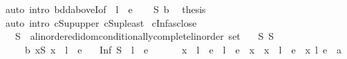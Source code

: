 \begin{isabellebody}
\ {\isacharparenleft}{\kern0pt}auto\ intro{\isacharbang}{\kern0pt}{\isacharcolon}{\kern0pt}\ bdd{\isacharunderscore}{\kern0pt}aboveI{\isacharbrackleft}{\kern0pt}of\ {\isacharunderscore}{\kern0pt}\ {\isachardoublequoteopen}l\ {\isacharplus}{\kern0pt}\ e{\isachardoublequoteclose}{\isacharbrackright}{\kern0pt}{\isacharparenright}{\kern0pt}\isanewline
\ \ \isamarkupfalse%
\ S\ b\ \isamarkupfalse%
\ {\isacharquery}{\kern0pt}thesis\isanewline
\ \ \ \ \isamarkupfalse%
\ {\isacharasterisk}{\kern0pt}\ \isamarkupfalse%
\ {\isacharparenleft}{\kern0pt}auto\ intro{\isacharbang}{\kern0pt}{\isacharcolon}{\kern0pt}\ cSup{\isacharunderscore}{\kern0pt}upper{}\ cSup{\isacharunderscore}{\kern0pt}least{\isacharparenright}{\kern0pt}\isanewline
{}\isamarkupfalse%
%
\endisatagproof
{\isafoldproof}%
%
\isadelimproof
\isanewline
%
\endisadelimproof
\isanewline
{}\isamarkupfalse%
\ cInf{\isacharunderscore}{\kern0pt}asclose{\isacharcolon}{\kern0pt}\isanewline
\ \ \ S\ {\isacharcolon}{\kern0pt}{\isacharcolon}{\kern0pt}\ {\isachardoublequoteopen}{\isacharprime}{\kern0pt}a{\isacharcolon}{\kern0pt}{\isacharcolon}{\kern0pt}{\isacharbraceleft}{\kern0pt}linordered{\isacharunderscore}{\kern0pt}idom{\isacharcomma}{\kern0pt}conditionally{\isacharunderscore}{\kern0pt}complete{\isacharunderscore}{\kern0pt}linorder{\isacharbraceright}{\kern0pt}\ set{\isachardoublequoteclose}\isanewline
\ \ \ S{\isacharcolon}{\kern0pt}\ {\isachardoublequoteopen}S\ {\isasymnoteq}\ {\isacharbraceleft}{\kern0pt}{\isacharbraceright}{\kern0pt}{\isachardoublequoteclose}\isanewline
\ \ \ \ \ b{\isacharcolon}{\kern0pt}\ {\isachardoublequoteopen}{\isasymforall}x{\isasymin}S{\isachardot}{\kern0pt}\ {\isasymbar}x\ {\isacharminus}{\kern0pt}\ l{\isasymbar}\ {\isasymle}\ e{\isachardoublequoteclose}\isanewline
\ \ \ {\isachardoublequoteopen}{\isasymbar}Inf\ S\ {\isacharminus}{\kern0pt}\ l{\isasymbar}\ {\isasymle}\ e{\isachardoublequoteclose}\isanewline
%
\isadelimproof
%
\endisadelimproof
%
\isatagproof
{}\isamarkupfalse%
\ {\isacharminus}{\kern0pt}\isanewline
\ \ \isamarkupfalse%
\ {\isacharasterisk}{\kern0pt}{\isacharcolon}{\kern0pt}\ {\isachardoublequoteopen}{\isasymbar}x\ {\isacharminus}{\kern0pt}\ l{\isasymbar}\ {\isasymle}\ e\ {\isasymlongleftrightarrow}\ l\ {\isacharminus}{\kern0pt}\ e\ {\isasymle}\ x\ {\isasymand}\ x\ {\isasymle}\ l\ {\isacharplus}{\kern0pt}\ e{\isachardoublequoteclose}\ \ x\ l\ e\ {\isacharcolon}{\kern0pt}{\isacharcolon}{\kern0pt}\ {\isacharprime}{\kern0pt}a\isanewline

\end{isabellebody}
